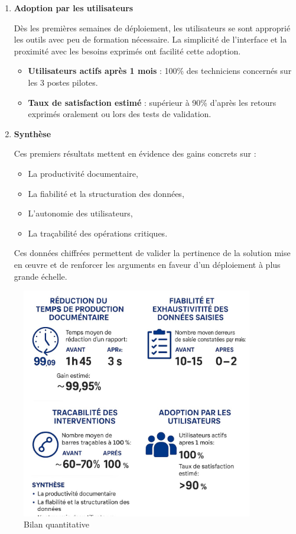\documentclass[11pt,a4paper]{article}
\begin{document}
\begin{enumerate}
\item \textbf{Adoption par les utilisateurs}

Dès les premières semaines de déploiement, les utilisateurs se sont approprié les outils avec peu de formation nécessaire. La simplicité de l’interface et la proximité avec les besoins exprimés ont facilité cette adoption.

\begin{itemize}
    \item \textbf{Utilisateurs actifs après 1 mois} : 100\% des techniciens concernés sur les 3 postes pilotes.
    \item \textbf{Taux de satisfaction estimé} : supérieur à 90\% d’après les retours exprimés oralement ou lors des tests de validation.
\end{itemize}

\item \textbf{Synthèse}

Ces premiers résultats mettent en évidence des gains concrets sur :
\begin{itemize}
    \item La productivité documentaire,
    \item La fiabilité et la structuration des données,
    \item L’autonomie des utilisateurs,
    \item La traçabilité des opérations critiques.
\end{itemize}

Ces données chiffrées permettent de valider la pertinence de la solution mise en œuvre et de renforcer les arguments en faveur d’un déploiement à plus grande échelle.
\end{enumerate}

\begin{figure}[H]
    \centering
    \includegraphics[width=0.9\textwidth]{../Images/bilan_quantitative.jpg}
    \caption{Bilan quantitative}
    \label{fig:architecture_logiciel}
\end{figure}
\end{document}
